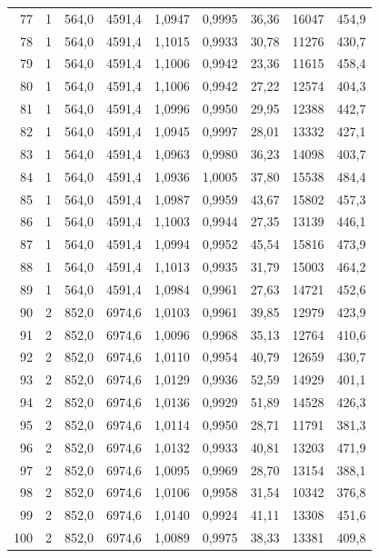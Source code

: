 \documentclass[11pt,a4paper]{article}
\begin{document}
{\begin{longtable}{r c r r r r r r r}
77 & 1 & 564,0 & 4591,4 & 1,0947 & 0,9995 & 36,36 & 16047 & 454,9 \\
78 & 1 & 564,0 & 4591,4 & 1,1015 & 0,9933 & 30,78 & 11276 & 430,7 \\
79 & 1 & 564,0 & 4591,4 & 1,1006 & 0,9942 & 23,36 & 11615 & 458,4 \\
80 & 1 & 564,0 & 4591,4 & 1,1006 & 0,9942 & 27,22 & 12574 & 404,3 \\
81 & 1 & 564,0 & 4591,4 & 1,0996 & 0,9950 & 29,95 & 12388 & 442,7 \\
82 & 1 & 564,0 & 4591,4 & 1,0945 & 0,9997 & 28,01 & 13332 & 427,1 \\
83 & 1 & 564,0 & 4591,4 & 1,0963 & 0,9980 & 36,23 & 14098 & 403,7 \\
84 & 1 & 564,0 & 4591,4 & 1,0936 & 1,0005 & 37,80 & 15538 & 484,4 \\
85 & 1 & 564,0 & 4591,4 & 1,0987 & 0,9959 & 43,67 & 15802 & 457,3 \\
86 & 1 & 564,0 & 4591,4 & 1,1003 & 0,9944 & 27,35 & 13139 & 446,1 \\
87 & 1 & 564,0 & 4591,4 & 1,0994 & 0,9952 & 45,54 & 15816 & 473,9 \\
88 & 1 & 564,0 & 4591,4 & 1,1013 & 0,9935 & 31,79 & 15003 & 464,2 \\
89 & 1 & 564,0 & 4591,4 & 1,0984 & 0,9961 & 27,63 & 14721 & 452,6 \\
90 & 2 & 852,0 & 6974,6 & 1,0103 & 0,9961 & 39,85 & 12979 & 423,9 \\
91 & 2 & 852,0 & 6974,6 & 1,0096 & 0,9968 & 35,13 & 12764 & 410,6 \\
92 & 2 & 852,0 & 6974,6 & 1,0110 & 0,9954 & 40,79 & 12659 & 430,7 \\
93 & 2 & 852,0 & 6974,6 & 1,0129 & 0,9936 & 52,59 & 14929 & 401,1 \\
94 & 2 & 852,0 & 6974,6 & 1,0136 & 0,9929 & 51,89 & 14528 & 426,3 \\
95 & 2 & 852,0 & 6974,6 & 1,0114 & 0,9950 & 28,71 & 11791 & 381,3 \\
96 & 2 & 852,0 & 6974,6 & 1,0132 & 0,9933 & 40,81 & 13203 & 471,9 \\
97 & 2 & 852,0 & 6974,6 & 1,0095 & 0,9969 & 28,70 & 13154 & 388,1 \\
98 & 2 & 852,0 & 6974,6 & 1,0106 & 0,9958 & 31,54 & 10342 & 376,8 \\
99 & 2 & 852,0 & 6974,6 & 1,0140 & 0,9924 & 41,11 & 13308 & 451,6 \\
100 & 2 & 852,0 & 6974,6 & 1,0089 & 0,9975 & 38,33 & 13381 & 409,8 \\

\end{longtable}}
\end{document}
